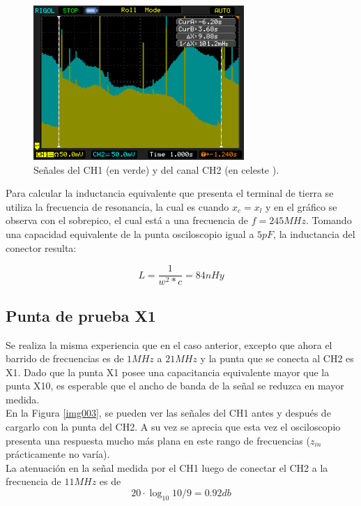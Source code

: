 \documentclass[a4paper,10pt]{article}
\begin{document}
		\begin{figure}[!htb]
			\centering
			\includegraphics[width=8cm]
			{Imagenes/Mediciones instrumentos/NewFile0.png}
			\caption{Se\~nales del CH1 (en verde) y del canal CH2 (en celeste
			).} \label{img000}
		\end{figure}

		\indent Para calcular la inductancia equivalente que presenta el 
		terminal de tierra se utiliza la frecuencia de resonancia, la cual 
		es cuando $x_c = x_l$ y en el gráfico se observa con el sobrepico, el
		cual está a una frecuencia de $f = 245 MHz$. Tomando una capacidad 
		equivalente de la punta osciloscopio igual a $5pF$, la inductancia 
		del conector resulta:

		\begin{equation*}
			 L = \frac{1}{w^2*c} = 84 nHy 
		\end{equation*}

									
		\subsection{Punta de prueba X1}
		\indent Se realiza la misma experiencia que en el caso anterior, 
		excepto que ahora el barrido de frecuencias es de $1MHz$ a $21MHz$ y 
		la punta que se conecta al CH2 es X1. Dado que la punta X1 posee una 
		capacitancia equivalente mayor que la punta X10, es esperable que el 
		ancho de banda de la se\~nal se reduzca en mayor medida. \\

		\indent En la Figura \ref{img003}, se pueden ver las se\~nales del CH1
		antes y despu\'es de cargarlo con la punta del CH2. A su vez se 
		aprecia que esta vez el osciloscopio presenta una respuesta mucho más
		plana en este rango de frecuencias ($z_{in}$ prácticamente no varía). \\
		\indent La atenuación en la señal medida por el CH1 luego de conectar
		el CH2 a la frecuencia de $11 MHz$ es de 
		$$ 20\cdot \log_{10}10/9 = 0.92db $$
		
\end{document}
